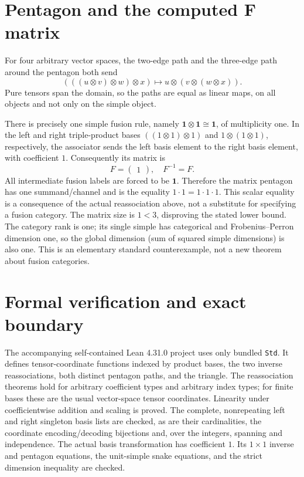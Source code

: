 \documentclass[11pt]{article}
\begin{document}
\section{Pentagon and the computed F matrix}
For four arbitrary vector spaces, the two-edge path and the three-edge path
around the pentagon both send
\[
 (((u\otimes v)\otimes w)\otimes x)
       \longmapsto u\otimes(v\otimes(w\otimes x)).
\]
Pure tensors span the domain, so the paths are equal as linear maps, on all
objects and not only on the simple object.

There is precisely one simple fusion rule, namely
$\mathbf1\otimes\mathbf1\cong\mathbf1$, of multiplicity one. In the left
and right triple-product bases
$((1\otimes1)\otimes1)$ and $1\otimes(1\otimes1)$, respectively, the
associator sends the left basis element to the right basis element, with
coefficient $1$. Consequently its matrix is
\[
 F=\begin{pmatrix}1\end{pmatrix},\quad F^{-1}=F.
\]
All intermediate fusion labels are forced to be $\mathbf1$. Therefore the
matrix pentagon has one summand/channel and is the equality
$1\cdot1=1\cdot1\cdot1$. This scalar equality is a consequence of the actual
reassociation above, not a substitute for specifying a fusion category.
The matrix size is $1<3$, disproving the stated lower bound. The category rank
is one; its single simple has categorical and Frobenius--Perron dimension one,
so the global dimension (sum of squared simple dimensions) is also one.
This is an elementary standard counterexample, not a new theorem about fusion
categories.

\section{Formal verification and exact boundary}
The accompanying self-contained Lean 4.31.0 project uses only bundled
\texttt{Std}. It defines tensor-coordinate functions indexed by product bases,
the two inverse reassociations, both distinct pentagon paths, and the triangle.
The reassociation theorems hold for arbitrary coefficient types and arbitrary
index types; for finite bases these are the usual vector-space tensor
coordinates. Linearity under coefficientwise addition and scaling is proved.
The complete, nonrepeating left and right singleton basis lists are checked,
as are their cardinalities, the coordinate encoding/decoding bijections and,
over the integers, spanning and independence. The actual basis transformation
has coefficient $1$. Its $1\times1$ inverse and pentagon equations, the
unit-simple snake equations, and the strict dimension inequality are checked.
\end{document}
